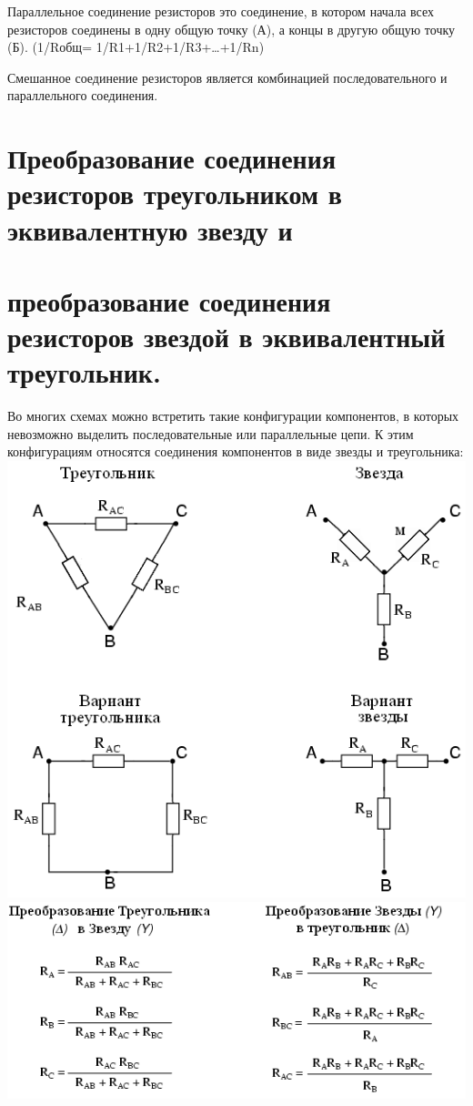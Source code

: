 \documentclass[a4paper, 12pt]{article}
\begin{document}
Параллельное соединение резисторов это соединение, в котором начала всех резисторов соединены в одну общую точку (А), а концы в другую общую точку (Б). (1/Rобщ= 1/R1+1/R2+1/R3+…+1/Rn)

Смешанное соединение резисторов является комбинацией последовательного и параллельного соединения.
\section{Преобразование соединения резисторов треугольником в эквивалентную звезду и }
\section{преобразование соединения резисторов звездой в эквивалентный треугольник.}
Во многих схемах можно встретить такие конфигурации компонентов, в которых невозможно выделить последовательные или параллельные цепи. К этим конфигурациям относятся соединения компонентов в виде звезды и треугольника:\\
\includegraphics{4-1.png}\\
\includegraphics{4-2.png}\\
\end{document}
